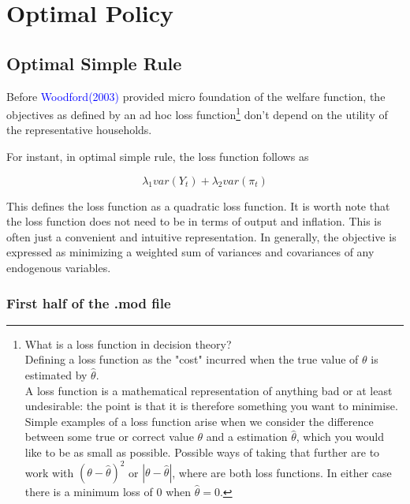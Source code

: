 \documentclass[cn,10pt,math=newtx,citestyle=gb7714-2015,bibstyle=gb7714-2015]{elegantbook}
\begin{document}
	\section{Optimal Policy}
	
	\subsection{Optimal Simple Rule}
	
	Before \textcolor{blue}{Woodford(2003)} provided micro foundation of the welfare function, the objectives as defined by an ad hoc loss function\footnote{What is a loss function in decision theory?\\Defining a loss function as the "cost" incurred when the true value of $\theta$ is estimated by $\hat{\theta}$.\\A loss function is a mathematical representation of anything bad or at least undesirable: the point is that it is therefore something you want to minimise. Simple examples of a loss function arise when we consider the difference between some true or correct value $\theta$ and a estimation $\hat{\theta}$, which you would like to be as small as possible. Possible ways of taking that further are to work with $(\theta-\hat{\theta})^2$ or $|\theta-\hat{\theta}|$, where are both loss functions. In either case there is a minimum loss of 0 when $\hat{\theta}=0$.} don't depend on the utility of the representative households.
	
	For instant, in optimal simple rule, the loss function follows as
	
	$$\lambda_1 var(Y_t)+\lambda_2 var(\pi_t)$$
	
	This defines the loss function as a quadratic loss function. It is worth note that the loss function does not need to be in terms of output and inflation. This is often just a convenient and intuitive representation. In generally, the objective is expressed as minimizing a weighted sum of variances and covariances of any endogenous variables.
	
	\subsubsection{First half of the .mod file}
	
\end{document}

